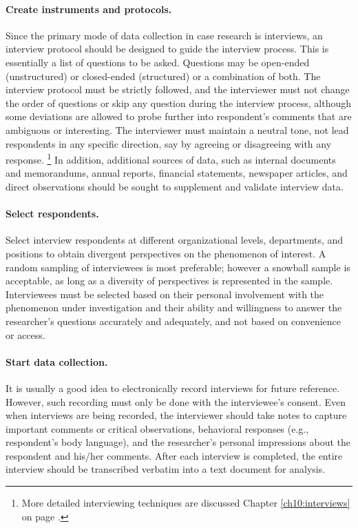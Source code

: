 \paragraph{Create instruments and protocols.} Since the primary mode of data collection in case research is interviews, an interview protocol should be designed to guide the interview process. This is essentially a list of questions to be asked. Questions may be open-ended (unstructured) or closed-ended (structured) or a combination of both. The interview protocol must be strictly followed, and the interviewer must not change the order of questions or skip any question during the interview process, although some deviations are allowed to probe further into respondent's comments that are ambiguous or interesting. The interviewer must maintain a neutral tone, not lead respondents in any specific direction, say by agreeing or disagreeing with any response. \footnote{More detailed interviewing techniques are discussed Chapter \ref{ch10:interviews} on page \pageref{ch10:interviews}.} In addition, additional sources of data, such as internal documents and memorandums, annual reports, financial statements, newspaper articles, and direct observations should be sought to supplement and validate interview data.

\paragraph{Select respondents.} Select interview respondents at different organizational levels, departments, and positions to obtain divergent perspectives on the phenomenon of interest. A random sampling of interviewees is most preferable; however a snowball sample is acceptable, as long as a diversity of perspectives is represented in the sample. Interviewees must be selected based on their personal involvement with the phenomenon under investigation and their ability and willingness to answer the researcher's questions accurately and adequately, and not based on convenience or access.

\paragraph{Start data collection.} It is usually a good idea to electronically record interviews for future reference. However, such recording must only be done with the interviewee's consent. Even when interviews are being recorded, the interviewer should take notes to capture important comments or critical observations, behavioral responses (e.g., respondent's body language), and the researcher's personal impressions about the respondent and his/her comments. After each interview is completed, the entire interview should be transcribed verbatim into a text document for analysis.

